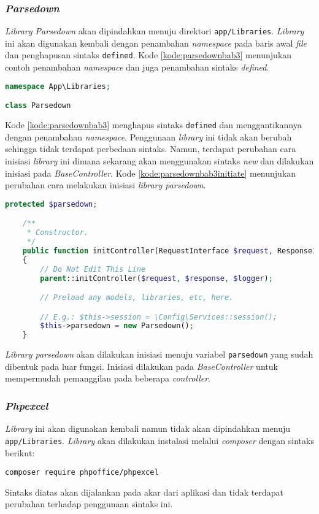 \subsubsection{\textit{Parsedown}}
\textit{Library Parsedown} akan dipindahkan menuju direktori \texttt{app/Libraries}. \textit{Library} ini akan digunakan kembali dengan penambahan \textit{namespace} pada baris awal \textit{file} dan penghapusan sintaks \texttt{defined}.  Kode \ref{kode:parsedownbab3} menunjukan contoh penambahan \textit{namespace} dan juga penambahan sintaks \textit{defined}.
\begin{lstlisting}[language=PHP, caption=Perancangan perubahan \textit{library Parsedown} pada \textit{CodeIgniter 4}, label=kode:parsedownbab3]
namespace App\Libraries;

class Parsedown
\end{lstlisting}
Kode \ref{kode:parsedownbab3} menghapus sintaks \texttt{defined} dan menggantikannya dengan penambahan \textit{namespace}. Penggunaan \textit{library} ini tidak akan berubah sehingga tidak terdapat perbedaan sintaks. Namun, terdapat perubahan cara inisiasi \textit{library} ini dimana sekarang akan menggunakan sintaks \textit{new} dan dilakukan inisiasi pada \textit{BaseController}. Kode \ref{kode:parsedownbab3initiate} menunjukan perubahan cara melakukan inisiasi \textit{library parsedown}.

\begin{lstlisting}[language=PHP, caption=Perancangan perubahan inisiasi \textit{library Parsedown} pada \textit{controller CodeIgniter 4}, label=kode:parsedownbab3initiate]
 	protected $parsedown;

    /**
     * Constructor.
     */
    public function initController(RequestInterface $request, ResponseInterface $response, LoggerInterface $logger)
    {
        // Do Not Edit This Line
        parent::initController($request, $response, $logger);

        // Preload any models, libraries, etc, here.

        // E.g.: $this->session = \Config\Services::session();
        $this->parsedown = new Parsedown();
    }
\end{lstlisting}

\textit{Library parsedown} akan dilakukan inisiasi menuju variabel \texttt{parsedown} yang sudah dibentuk pada luar fungsi. Inisiasi dilakukan pada \textit{BaseController} untuk mempermudah pemanggilan pada beberapa \textit{controller}. 

\subsubsection{\textit{Phpexcel}}
\textit{Library} ini akan digunakan kembali namun tidak akan dipindahkan menuju \texttt{app/Libraries}. \textit{Library} akan dilakukan instalasi melalui \textit{composer} dengan sintaks berikut:
\begin{center}
	\verb|composer require phpoffice/phpexcel|
\end{center}
Sintaks diatas akan dijalankan pada akar dari aplikasi dan tidak terdapat perubahan terhadap penggunaan sintaks ini.

